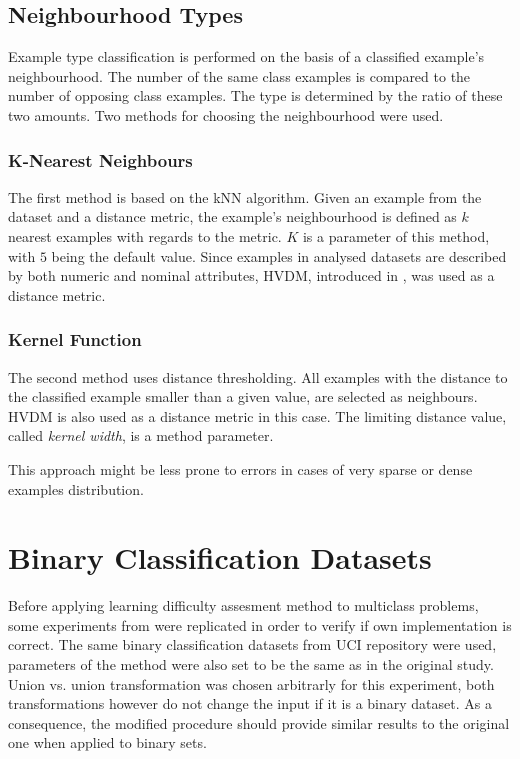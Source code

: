 \documentclass[12pt]{article}
\begin{document}
\subsection{Neighbourhood Types}

Example type classification is performed on the basis of a classified example's neighbourhood. The number of the same class examples is compared to the number of opposing class examples. The type is determined by the ratio of these two amounts. Two methods for choosing the neighbourhood were used.

\subsubsection{K-Nearest Neighbours}

The first method is based on the kNN algorithm. Given an example from the dataset and a distance metric, the example's neighbourhood is defined as $k$ nearest examples with regards to the metric. $K$ is a parameter of this method, with $5$ being the default value. Since examples in analysed datasets are described by both numeric and nominal attributes, HVDM, introduced in \cite{Wilson1997}, was used as a distance metric.

\subsubsection{Kernel Function}

The second method uses distance thresholding. All examples with the distance to the classified example smaller than a given value, are selected as neighbours. HVDM is also used as a distance metric in this case. The limiting distance value, called \textit{kernel width}, is a method parameter. 

This approach might be less prone to errors in cases of very sparse or dense examples distribution.

\section{Binary Classification Datasets}

Before applying learning difficulty assesment method to multiclass problems, some experiments from \cite{Napierala2016} were replicated in order to verify if own implementation is correct. The same binary classification datasets from UCI repository were used, parameters of the method were also set to be the same as in the original study. Union vs. union transformation was chosen arbitrarly for this experiment, both transformations however do not change the input if it is a binary dataset. As a consequence, the modified procedure should provide similar results to the original one when applied to binary sets.
\end{document}
